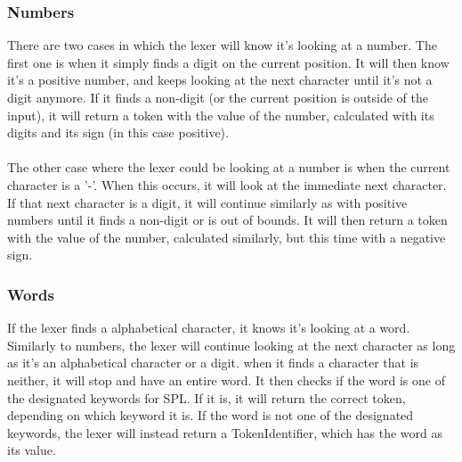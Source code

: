 \documentclass[10pt,a4paper]{article}
\begin{document}
\subsubsection{Numbers}
There are two cases in which the lexer will know it's looking at a number. The first one is when it simply finds a digit on the current position. It will then know it's a positive number, and keeps looking at the next character until it's not a digit anymore. If it finds a non-digit (or the current position is outside of the input), it will return a token with the value of the number, calculated with its digits and its sign (in this case positive).\\
\\
The other case where the lexer could be looking at a number is when the current character is a '-'. When this occurs, it will look at the immediate next character. If that next character is a digit, it will continue similarly as with positive numbers until it finds a non-digit or is out of bounds. It will then return a token with the value of the number, calculated similarly, but this time with a negative sign.

\subsubsection{Words}
If the lexer finds a alphabetical character, it knows it's looking at a word. Similarly to numbers, the lexer will continue looking at the next character as long as it's an alphabetical character or a digit. when it finds a character that is neither, it will stop and have an entire word. It then checks if the word is one of the designated keywords for SPL. If it is, it will return the correct token, depending on which keyword it is. If the word is not one of the designated keywords, the lexer will instead return a TokenIdentifier, which has the word as its value.
\end{document}
